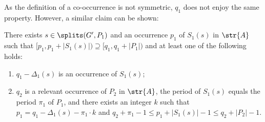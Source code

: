 As the definition of a co-occurrence is not symmetric, $q_1$ does not enjoy the same property. However, a similar claim can be shown:

\begin{lemma}\label{lm:q1}
There exists $s \in \splits(G', P_1)$ and an occurrence $p_1$ of $S_1(s)$ in $\str{A}$ such that $[p_1,p_1+|S_1(s)|) \supseteq [q_1,q_1+|P_1|)$ and at least one of the following holds:
\begin{enumerate}
\item $q_1-\Delta_1(s)$ is an occurrence of $S_1(s)$;
\item $q_2$ is a relevant occurrence of $P_2$ in $\str{A}$, the period of $S_1(s)$ equals the period $\pi_1$ of $P_1$, and there exists an integer $k$ such that $p_1 = q_1-\Delta_1(s)-\pi_1 \cdot k$ and $q_2+\pi_1-1 \le p_1 +|S_1(s)|-1 \le q_2+|P_2|-1$.
\end{enumerate}
\end{lemma}
